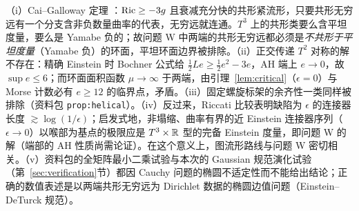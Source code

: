 \begin{remark}\label{rem:W}
（i）Cai--Galloway 定理 \cite{CG}：$\operatorname{Ric}\ge-3g$ 且衰减充分快的共形紧流形，只要共形无穷远有一个分支含非负数量曲率的代表，无穷远就连通。$T^3$ 上的共形类要么含平坦度量，要么是 Yamabe 负的；故问题 W 中两端的共形无穷远都必须是\emph{不共形于平坦度量}（Yamabe 负）的环面，平坦环面边界被排除。（ii）正交传递 $T^2$ 对称的解不存在：精确 Einstein 时 Bochner 公式给 $\frac12Le\ge\frac12e^2-3e$，AH 端上 $e\to0$，故 $\sup e\le6$；而环面面积函数 $\mu\to\infty$ 于两端，由引理~\ref{lem:critical}（$\epsilon=0$）与 Morse 计数必有 $e\ge12$ 的临界点，矛盾。（iii）固定螺旋标架的余齐性一类同样被排除（资料包 \texttt{prop:helical}）。（iv）反过来，Riccati 比较表明缺陷为 $\epsilon$ 的连接器长度 $\gtrsim\log(1/\epsilon)$；启发式地，非塌缩、曲率有界的近 Einstein 连接器序列（$\epsilon\to0$）以喉部为基点的极限应是 $T^3\times\mathbb R$ 型的完备 Einstein 度量，即问题 W 的解（端部的 AH 性质尚需论证）。在这个意义上，图流形路线与问题 W 密切相关。（v）资料包的全矩阵最小二乘试验与本次的 Gaussian 规范演化试验（第~\ref{sec:verification}节）都因 Cauchy 问题的椭圆不适定性而不能给出结论；正确的数值表述是以两端共形无穷远为 Dirichlet 数据的椭圆边值问题（Einstein--DeTurck 规范）。
\end{remark}
